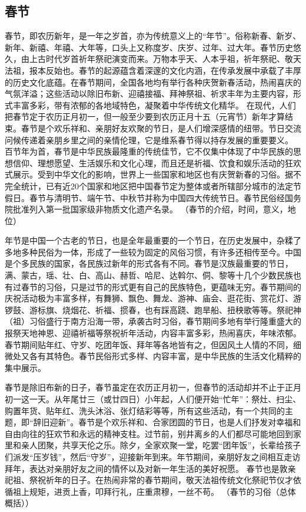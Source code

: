 \subsection{春节}
\par
春节，即农历新年，是一年之岁首，亦为传统意义上的“年节”。俗称新春、新岁、新年、新禧、年禧、大年等，口头上又称度岁、庆岁、过年、过大年。春节历史悠久，由上古时代岁首祈年祭祀演变而来。万物本乎天、人本乎祖，祈年祭祀、敬天法祖，报本反始也。春节的起源蕴含着深邃的文化内涵，在传承发展中承载了丰厚的历史文化底蕴。在春节期间，全国各地均有举行各种庆贺新春活动，热闹喜庆的气氛洋溢；这些活动以除旧布新、迎禧接福、拜神祭祖、祈求丰年为主要内容，形式丰富多彩，带有浓郁的各地域特色，凝聚着中华传统文化精华。
在现代，人们把春节定于农历正月初一，但一般至少要到农历正月十五（元宵节）新年才算结束。春节是个欢乐祥和、亲朋好友欢聚的节日，是人们增深感情的纽带。节日交流问候传递着亲朋乡里之间的亲情伦理，它是维系春节得以持存发展的重要要义。
百节年为首，春节是中华民族最隆重的传统佳节，它不仅集中体现了中华民族的思想信仰、理想愿望、生活娱乐和文化心理，而且还是祈福、饮食和娱乐活动的狂欢式展示。受到中华文化的影响，世界上一些国家和地区也有庆贺新春的习俗。据不完全统计，已有近20个国家和地区把中国春节定为整体或者所辖部分城市的法定节假日。春节与清明节、端午节、中秋节并称为中国四大传统节日。春节民俗经国务院批准列入第一批国家级非物质文化遗产名录。                                                     （春节的介绍，时间，意义，地位）
\par
年节是中国一个古老的节日，也是全年最重要的一个节日，在历史发展中，杂糅了多地多种民俗为一体，形成了一些较为固定的风俗习惯，有许多还相传至今。中国是个多民族的国家，各民族过新年的形式各有不同。春节是汉族最重要的节日，满、蒙古，瑶、壮、白、高山、赫哲、哈尼、达斡尔、侗、黎等十几个少数民族也有过春节的习俗，只是过节的形式更有自己的民族特色，更蕴味无穷。春节期间的庆祝活动极为丰富多样，有舞狮、飘色、舞龙、游神、庙会、逛花街、赏花灯、游锣鼓、游标旗、烧烟花、祈福、掼春，也有踩高跷、跑旱船、扭秧歌等等。祭祀神（祖）习俗盛行于南方沿海一带，承袭古时习俗，春节期间多地有举行隆重盛大的报祭天地神恩、迎禧祈福等祭祝祈年活动，内容丰富多彩，热闹喜庆，年味浓郁。春节期间贴年红、守岁、吃团年饭、拜年等各地皆有之，但因风土人情的不同，细微处又各有其特色。春节民俗形式多样、内容丰富，是中华民族的生活文化精粹的集中展示。
\par
春节是除旧布新的日子，春节虽定在农历正月初一，但春节的活动却并不止于正月初一这一天。从年尾廿三（或廿四日）小年起，人们便开始“忙年”：祭灶、扫尘、购置年货、贴年红、洗头沐浴、张灯结彩等等，所有这些活动，有一个共同的主题，即“辞旧迎新”。春节是个欢乐祥和、合家团圆的节日，也是人们抒发对幸福和自由向往的狂欢节和永远的精神支柱。过节前，别井离乡的人们都尽可能地回到家里和亲人团聚，共享天伦之乐。除夕，全家欢聚一堂，吃罢“团年饭”，长辈给孩子们派发“压岁钱”，然后“守岁”，迎接新年到来。年节期间，亲朋好友之间相互走访拜年，表达对亲朋好友之间的情怀以及对新一年生活的美好祝愿。
春节也是敦亲祀祖、祭祝祈年的日子。在热闹非常的春节期间，敬天法祖传统文化祭祀节仪才依循祖上规矩，进贡上香，叩拜行礼，庄重肃穆，一丝不苟。                               （春节的习俗（总体概括））

